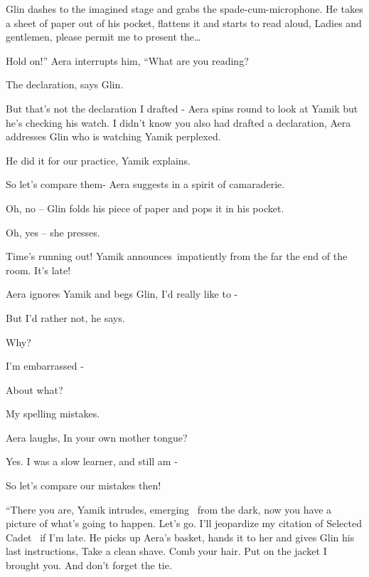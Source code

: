 \documentclass[letterpaper]{article}
\begin{document}
Glin dashes to the imagined stage and grabs the\textcolor{red}{ }spade-cum-microphone. He takes a sheet of paper out of
his pocket, flattens it and starts to read aloud, {\textquotedbl}Ladies and gentlemen, please permit me to present
the{\dots} {\textquotedbl} 

{\textquotedbl}Hold on!'' Aera interrupts him, ``What are you reading?{\textquotedbl} 

{\textquotedbl}The declaration,{\textquotedbl} says Glin. 

{\textquotedbl}But that's not the declaration I drafted -{\textquotedbl} Aera spins round to look at Yamik but he's
checking his watch. {\textquotedbl}I didn't know you also had drafted a declaration,{\textquotedbl} Aera addresses Glin
who is watching Yamik perplexed.

{\textquotedbl}He did it for our practice,{\textquotedbl} Yamik explains. 

{\textquotedbl}So let's compare them-{\textquotedbl} Aera suggests in a spirit of camaraderie.

{\textquotedbl}Oh, no --{\textquotedbl} Glin folds his piece of paper and pops it in his pocket.

{\textquotedbl}Oh, yes --{\textquotedbl} she presses.

{\textquotedbl}Time's running out!{\textquotedbl} Yamik announces~impatiently from the far the end of the room.
{\textquotedbl}It's late!{\textquotedbl}

Aera ignores Yamik and begs Glin, {\textquotedbl}I'd really like to -{\textquotedbl} 

{\textquotedbl}But I'd rather not,{\textquotedbl} he says. 

{\textquotedbl}Why?{\textquotedbl} 

{\textquotedbl}I'm embarrassed -{\textquotedbl} 

{\textquotedbl}About what?{\textquotedbl}~ 

{\textquotedbl}My spelling mistakes.{\textquotedbl} 

Aera laughs, {\textquotedbl}In your own mother tongue?{\textquotedbl} 

{\textquotedbl}Yes. I was a slow learner, and still am -{\textquotedbl} 

{\textquotedbl}So let's compare our mistakes then!{\textquotedbl} 

{}``There you are,{\textquotedbl} Yamik intrudes, emerging \ from the dark, {\textquotedbl}now you have a picture of
what's going to happen. Let's go. I'll jeopardize my citation of Selected Cadet \ if I'm late.{\textquotedbl} He picks
up Aera's basket, hands it to her and gives Glin his last instructions, {\textquotedbl}Take a clean shave. Comb your
hair. Put on the jacket I brought you. And don't forget the tie.{\textquotedbl} 
\end{document}
